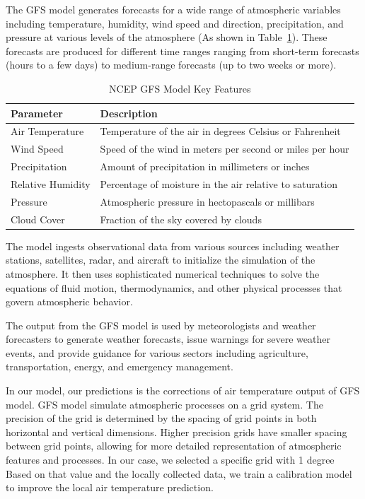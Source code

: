 \documentclass[12pt]{article}
\begin{document}
The GFS model generates forecasts for a wide range of atmospheric variables including temperature, humidity, wind speed and direction, precipitation, and pressure at various levels of the atmosphere (As shown in Table~\ref{tab:GFS}). These forecasts are produced for different time ranges ranging from short-term forecasts (hours to a few days) to medium-range forecasts (up to two weeks or more).

\begin{table}[htbp]
    \centering
    \caption{NCEP GFS Model Key Features}
    \begin{tabular}{@{}ll@{}}
        \toprule
        \textbf{Parameter} & \textbf{Description} \\
        \midrule
        Air Temperature & Temperature of the air in degrees Celsius or Fahrenheit \\
        Wind Speed & Speed of the wind in meters per second or miles per hour \\
        Precipitation & Amount of precipitation in millimeters or inches \\
        Relative Humidity & Percentage of moisture in the air relative to saturation \\
        Pressure & Atmospheric pressure in hectopascals or millibars \\
        Cloud Cover & Fraction of the sky covered by clouds \\
        \bottomrule
    \end{tabular}
    \label{tab:GFS}
\end{table}

The model ingests observational data from various sources including weather stations, satellites, radar, and aircraft to initialize the simulation of the atmosphere. It then uses sophisticated numerical techniques to solve the equations of fluid motion, thermodynamics, and other physical processes that govern atmospheric behavior.

The output from the GFS model is used by meteorologists and weather forecasters to generate weather forecasts, issue warnings for severe weather events, and provide guidance for various sectors including agriculture, transportation, energy, and emergency management.

In our model, our predictions is the corrections of air temperature output of GFS model. GFS model simulate atmospheric processes on a grid system. The precision of the grid is determined by the spacing of grid points in both horizontal and vertical dimensions. Higher precision grids have smaller spacing between grid points, allowing for more detailed representation of atmospheric features and processes. In our case, we selected a specific grid with 1 degree Based on that value and the locally collected data, we train a calibration model to improve the local air temperature prediction.
\end{document}
